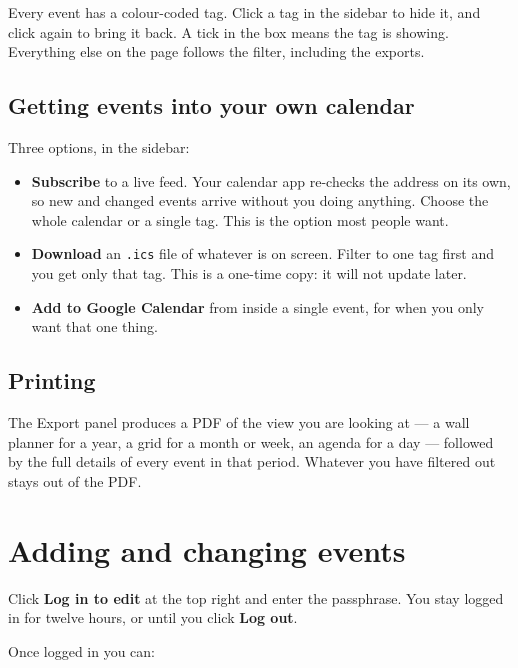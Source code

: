 \documentclass[11pt,a4paper]{article}
\newcommand{\code}[1]{\texttt{\small #1}}
\begin{document}
Every event has a colour-coded tag. Click a tag in the sidebar to hide it, and
click again to bring it back. A tick in the box means the tag is showing.
Everything else on the page follows the filter, including the exports.

\subsection{Getting events into your own calendar}

Three options, in the sidebar:

\begin{itemize}
  \item \textbf{Subscribe} to a live feed. Your calendar app re-checks the
        address on its own, so new and changed events arrive without you doing
        anything. Choose the whole calendar or a single tag. This is the option
        most people want.
  \item \textbf{Download} an \code{.ics} file of whatever is on screen. Filter
        to one tag first and you get only that tag. This is a one-time copy: it
        will not update later.
  \item \textbf{Add to Google Calendar} from inside a single event, for when
        you only want that one thing.
\end{itemize}

\subsection{Printing}

The Export panel produces a PDF of the view you are looking at — a wall planner
for a year, a grid for a month or week, an agenda for a day — followed by the
full details of every event in that period. Whatever you have filtered out
stays out of the PDF.

\section{Adding and changing events}

Click \textbf{Log in to edit} at the top right and enter the passphrase. You
stay logged in for twelve hours, or until you click \textbf{Log out}.

Once logged in you can:
\end{document}
